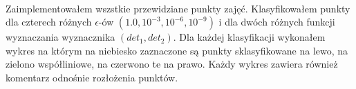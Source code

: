 \documentclass[12pt]{article}
\begin{document}
\maketitle

\paragraph{}
    Zaimplementowałem wszstkie przewidziane punkty zajęć.
    Klasyfikowałem punkty dla czterech różnych $\epsilon$-ów
        $(1.0, 10^{-3}, 10^{-6}, 10^{-9})$ i dla dwóch różnych funkcji wyznaczania
        wyznacznika $(det_1, det_2)$. Dla każdej klasyfikacji wykonałem wykres
        na którym na niebiesko zaznaczone są punkty sklasyfikowane na lewo,
        na zielono współliniowe, na czerwono te na prawo. Każdy wykres zawiera również
        komentarz odnośnie rozłożenia punktów.
\end{document}
